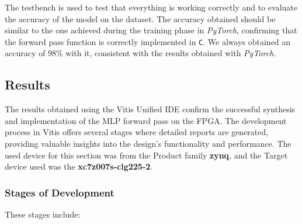 \documentclass{article}
\begin{document}
The testbench is used to test that everything is working correctly and to evaluate the accuracy of the model on the dataset. The accuracy obtained should be similar to the one achieved during the training phase in \textit{PyTorch}, confirming that the forward pass function is correctly implemented in \texttt{C}.
We always obtained an accuracy of 98\% with it, consistent with the results obtained with \textit{PyTorch}.

\subsection{Results}
The results obtained using the Vitis Unified IDE confirm the successful synthesis and implementation of the MLP forward pass on the FPGA. The development process in Vitis offers several stages where detailed reports are generated, providing valuable insights into the design's functionality and performance. The used device for this section was from the Product family \textbf{zynq}, and the Target device used was the \textbf{xc7z007s-clg225-2}.

\subsubsection{Stages of Development}
These stages include:
\end{document}
